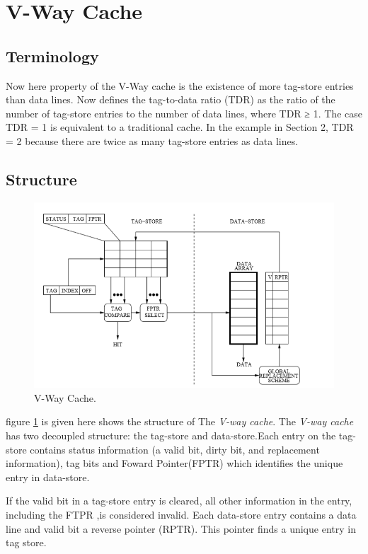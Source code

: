 \documentclass{report}
\begin{document}
\newpage

\section{ V-Way Cache}
\subsection{Terminology}
Now here  property of the V-Way cache is the existence of more tag-store entries than data lines. Now defines the tag-to-data ratio (TDR) as the ratio of the number of tag-store entries to the number of data lines, where TDR ≥ 1. The case TDR = 1 is equivalent to a traditional cache. In the example in Section 2, TDR = 2 because there are twice as many tag-store entries as data lines. 

\subsection{Structure}

\begin{figure}[h!]
\includegraphics[width=1\textwidth]{./fig4}
\caption{  V-Way Cache.}
\label{fig4}
\end{figure}

figure \ref{fig4} is given here shows the structure of The \emph{V-way cache}. The \emph{V-way cache} has two decoupled structure: the tag-store and data-store.Each entry on the tag-store contains status information (a valid bit, dirty bit, and replacement information), tag bits and Foward Pointer(FPTR) which identifies the unique entry in data-store.

\vspace{.8cm}
If the valid bit in a tag-store entry is cleared, all  other information in the entry, including the FTPR ,is considered invalid. Each data-store entry contains a data line and valid bit a reverse pointer (RPTR). This pointer finds a unique entry in tag store. 
\end{document}
